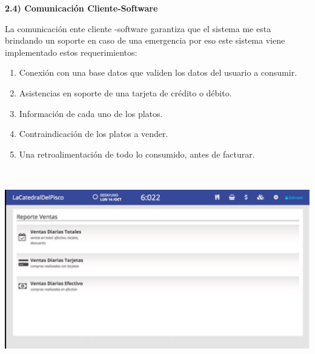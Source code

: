 \documentclass{article} %
\begin{document}
\noindent 

\noindent 

\noindent 

\noindent \textbf{2.4) Comunicaci\'{o}n Cliente-Software}

\noindent La comunicaci\'{o}n ente cliente -software garantiza que el sistema me esta brindando un soporte en caso de una emergencia por eso este sistema viene implementado estos requerimientos:

\begin{enumerate}
\item  Conexi\'{o}n con una base datos que validen los datos del usuario a consumir.

\item  Asistencias en soporte de una tarjeta de cr\'{e}dito o d\'{e}bito.

\item  Informaci\'{o}n de cada uno de los platos.

\item  Contraindicaci\'{o}n de los platos a vender.

\item  Una retroalimentaci\'{o}n de todo lo consumido, antes de facturar.
\end{enumerate}

\noindent \includegraphics*[width=6.67in, height=3.46in, keepaspectratio=false]{image7}

\noindent \textbf{}

\noindent 

\noindent 

\noindent 

\noindent 

\noindent 
\end{document}
